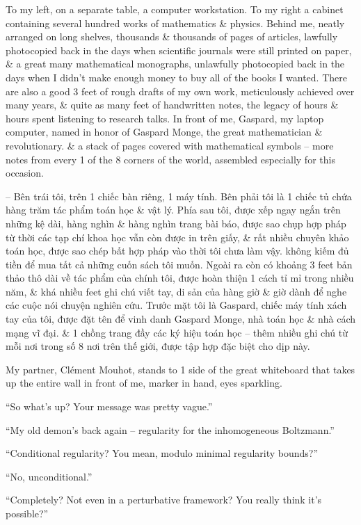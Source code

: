 \documentclass{article}
\begin{document}
\begin{enumerate}
	To my left, on a separate table, a computer workstation. To my right a cabinet containing several hundred works of mathematics \& physics. Behind me, neatly arranged on long shelves, thousands \& thousands of pages of articles, lawfully photocopied back in the days when scientific journals were  still printed on paper, \& a great many mathematical monographs, unlawfully photocopied back in the days when I didn't make enough money to buy all of the books I wanted. There are also a good 3 feet of rough drafts of my own work, meticulously achieved over many years, \& quite as many feet of handwritten notes, the legacy of hours \& hours spent listening to research talks. In front of me, Gaspard, my laptop computer, named in honor of Gaspard Monge, the great mathematician \& revolutionary. \& a stack of pages covered with mathematical symbols -- more notes from every 1 of the 8 corners of the world, assembled especially for this occasion.

	-- Bên trái tôi, trên 1 chiếc bàn riêng, 1 máy tính. Bên phải tôi là 1 chiếc tủ chứa hàng trăm tác phẩm toán học \& vật lý. Phía sau tôi, được xếp ngay ngắn trên những kệ dài, hàng nghìn \& hàng nghìn trang bài báo, được sao chụp hợp pháp từ thời các tạp chí khoa học vẫn còn được in trên giấy, \& rất nhiều chuyên khảo toán học, được sao chép bất hợp pháp vào thời tôi chưa làm vậy. không kiếm đủ tiền để mua tất cả những cuốn sách tôi muốn. Ngoài ra còn có khoảng 3 feet bản thảo thô dài về tác phẩm của chính tôi, được hoàn thiện 1 cách tỉ mỉ trong nhiều năm, \& khá nhiều feet ghi chú viết tay, di sản của hàng giờ \& giờ dành để nghe các cuộc nói chuyện nghiên cứu. Trước mặt tôi là Gaspard, chiếc máy tính xách tay của tôi, được đặt tên để vinh danh Gaspard Monge, nhà toán học \& nhà cách mạng vĩ đại. \& 1 chồng trang đầy các ký hiệu toán học -- thêm nhiều ghi chú từ mỗi nơi trong số 8 nơi trên thế giới, được tập hợp đặc biệt cho dịp này.

	My partner, Cl\'ement Mouhot, stands to 1 side of the great whiteboard that takes up the entire wall in front of me, marker in hand, eyes sparkling.

	``So what's up? Your message was pretty vague.''

	``My old demon's back again -- regularity for the inhomogeneous Boltzmann.''

	``Conditional regularity? You mean, modulo minimal regularity bounds?''

	``No, unconditional.''

	``Completely? Not even in a perturbative framework? You really think it's possible?''


\end{enumerate}
\end{document}
